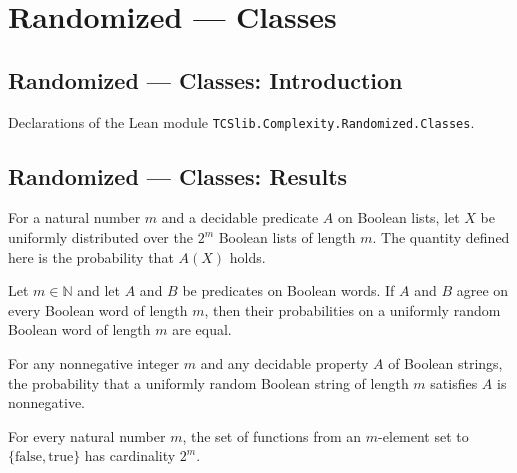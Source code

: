 \section{Randomized --- Classes}
\subsection*{Randomized --- Classes: Introduction}

Declarations of the Lean module \texttt{TCSlib.Complexity.Randomized.Classes}.

\subsection*{Randomized --- Classes: Results}

\begin{definition}
\label{Randomized.randProb}
\leanok
For a natural number $m$ and a decidable predicate $A$ on Boolean lists, let $X$ be
uniformly distributed over the $2^m$ Boolean lists of length $m$. The quantity defined
here is the probability that $A(X)$ holds.
\end{definition}

\begin{theorem}
\label{Randomized.randProb_congr}
\leanok
{}
Let $m\in\mathbb{N}$ and let $A$ and $B$ be predicates on Boolean words. If $A$ and $B$
agree on every Boolean word of length $m$, then their probabilities on a uniformly
random Boolean word of length $m$ are equal.
\end{theorem}

\begin{theorem}
\label{Randomized.randProb_nonneg}
\leanok
{}
For any nonnegative integer $m$ and any decidable property $A$ of Boolean strings, the
probability that a uniformly random Boolean string of length $m$ satisfies $A$ is
nonnegative.
\end{theorem}

\begin{theorem}
\label{Randomized.card_univ_bitstrings}
\leanok
{}
For every natural number $m$, the set of functions from an $m$-element set to
$\{\mathrm{false},\mathrm{true}\}$ has cardinality $2^m$.
\end{theorem}

